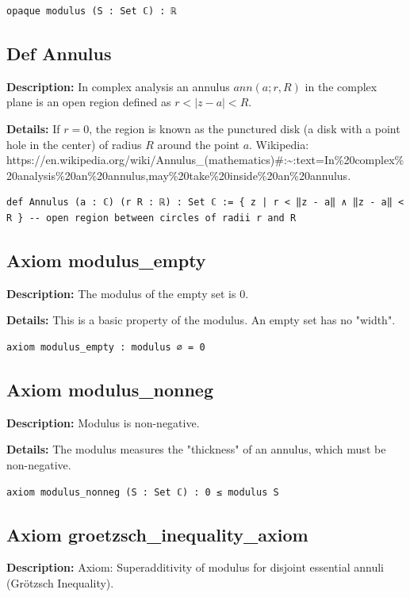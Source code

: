 \begin{lstlisting}[language=Lean]
opaque modulus (S : Set ℂ) : ℝ
\end{lstlisting}

\subsection*{Def Annulus}
\textbf{Description:} In complex analysis an annulus $ann(a; r, R)$ in the complex plane is an open region defined as $r<|z-a|<R$.

\textbf{Details:} If $r=0$, the region is known as the punctured disk (a disk with a point hole in the center) of radius $R$ around the point $a$.
Wikipedia: https://en.wikipedia.org/wiki/Annulus\_(mathematics)\#:\textasciitilde{}:text=In\%20complex\%20analysis\%20an\%20annulus,may\%20take\%20inside\%20an\%20annulus.

\begin{lstlisting}[language=Lean]
def Annulus (a : ℂ) (r R : ℝ) : Set ℂ := { z | r < ‖z - a‖ ∧ ‖z - a‖ < R } -- open region between circles of radii r and R
\end{lstlisting}

\subsection*{Axiom modulus\_empty}
\textbf{Description:} The modulus of the empty set is 0.

\textbf{Details:} This is a basic property of the modulus. An empty set has no "width".

\begin{lstlisting}[language=Lean]
axiom modulus_empty : modulus ∅ = 0
\end{lstlisting}

\subsection*{Axiom modulus\_nonneg}
\textbf{Description:} Modulus is non-negative.

\textbf{Details:} The modulus measures the "thickness" of an annulus, which must be non-negative.

\begin{lstlisting}[language=Lean]
axiom modulus_nonneg (S : Set ℂ) : 0 ≤ modulus S
\end{lstlisting}

\subsection*{Axiom groetzsch\_inequality\_axiom}
\textbf{Description:} Axiom: Superadditivity of modulus for disjoint essential annuli (Grötzsch Inequality).

